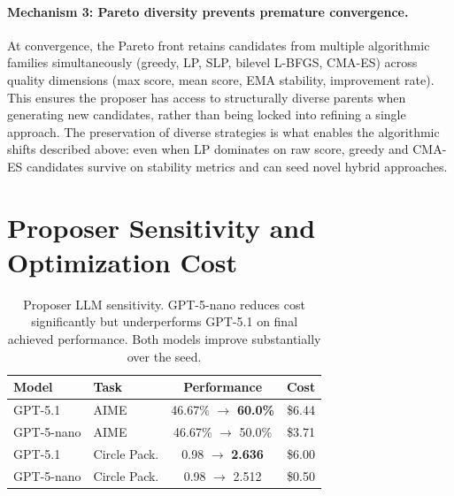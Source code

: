 \documentclass[sigconf]{acmart}
\begin{document}
\paragraph{Mechanism 3: Pareto diversity prevents premature convergence.}
At convergence, the Pareto front retains candidates from multiple algorithmic families simultaneously (greedy, LP, SLP, bilevel L-BFGS, CMA-ES) across quality dimensions (max score, mean score, EMA stability, improvement rate). This ensures the proposer has access to structurally diverse parents when generating new candidates, rather than being locked into refining a single approach. The preservation of diverse strategies is what enables the algorithmic shifts described above: even when LP dominates on raw score, greedy and CMA-ES candidates survive on stability metrics and can seed novel hybrid approaches.

\section{Proposer Sensitivity and Optimization Cost}\label{app:proposer-cost}

\begin{table}[h]
\caption{Proposer LLM sensitivity. GPT-5-nano reduces cost significantly but underperforms GPT-5.1 on final achieved performance. Both models improve substantially over the seed.}
\label{tab:proposer-sensitivity}
\small
\begin{tabular}{@{}llcc@{}}
\toprule
\textbf{Model} & \textbf{Task} & \textbf{Performance} & \textbf{Cost} \\
\midrule
GPT-5.1 & AIME & 46.67\% $\to$ \textbf{60.0\%} & \$6.44 \\
GPT-5-nano & AIME & 46.67\% $\to$ 50.0\% & \$3.71 \\
\midrule
GPT-5.1 & Circle Pack. & 0.98 $\to$ \textbf{2.636} & \$6.00 \\
GPT-5-nano & Circle Pack. & 0.98 $\to$ 2.512 & \$0.50 \\
\bottomrule
\end{tabular}
\end{table}
\end{document}
